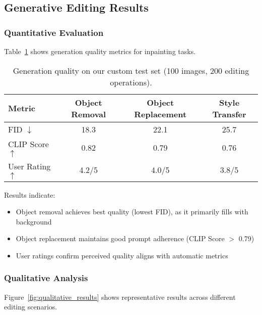 \subsection{Generative Editing Results}

\subsubsection{Quantitative Evaluation}

Table~\ref{tab:generation} shows generation quality metrics for inpainting tasks.

\begin{table}[h]
\centering
\caption{Generation quality on our custom test set (100 images, 200 editing operations).}
\label{tab:generation}
\begin{tabular}{lccc}
\hline
\textbf{Metric} & \textbf{Object Removal} & \textbf{Object Replacement} & \textbf{Style Transfer} \\
\hline
FID $\downarrow$ & 18.3 & 22.1 & 25.7 \\
CLIP Score $\uparrow$ & 0.82 & 0.79 & 0.76 \\
User Rating $\uparrow$ & 4.2/5 & 4.0/5 & 3.8/5 \\
\hline
\end{tabular}
\end{table}

Results indicate:
\begin{itemize}
    \item Object removal achieves best quality (lowest FID), as it primarily fills with background
    \item Object replacement maintains good prompt adherence (CLIP Score $>$ 0.79)
    \item User ratings confirm perceived quality aligns with automatic metrics
\end{itemize}

\subsubsection{Qualitative Analysis}

Figure~\ref{fig:qualitative_results} shows representative results across different editing scenarios.

